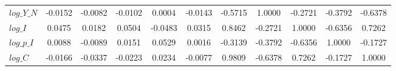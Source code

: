 \begin{center}
\begin{longtable}{lcccccccccc}
$log\_Y\_N  $	 & 	      -0.0152	 & 	      -0.0082	 & 	      -0.0102	 & 	       0.0004	 & 	      -0.0143	 & 	      -0.5715	 & 	       1.0000	 & 	      -0.2721	 & 	      -0.3792	 & 	      -0.6378 \\ 
$log\_I     $	 & 	       0.0475	 & 	       0.0182	 & 	       0.0504	 & 	      -0.0483	 & 	       0.0315	 & 	       0.8462	 & 	      -0.2721	 & 	       1.0000	 & 	      -0.6356	 & 	       0.7262 \\ 
$log\_p\_I  $	 & 	       0.0088	 & 	      -0.0089	 & 	       0.0151	 & 	       0.0529	 & 	       0.0016	 & 	      -0.3139	 & 	      -0.3792	 & 	      -0.6356	 & 	       1.0000	 & 	      -0.1727 \\ 
$log\_C     $	 & 	      -0.0166	 & 	      -0.0337	 & 	      -0.0223	 & 	       0.0234	 & 	      -0.0077	 & 	       0.9809	 & 	      -0.6378	 & 	       0.7262	 & 	      -0.1727	 & 	       1.0000 \\ 
\end{longtable}
 \end{center}
